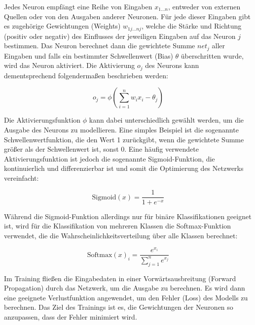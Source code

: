 Jedes Neuron empfängt eine Reihe von Eingaben $x_{1 \dots n}$, entweder von externen Quellen oder von den Ausgaben anderer Neuronen. Für jede dieser Eingaben gibt es zugehörige Gewichtungen (Weights) $w_{1j \dots nj}$, welche die Stärke und Richtung (positiv oder negativ) des Einflusses der jeweiligen Eingaben auf das Neuron $j$ bestimmen. Das Neuron berechnet dann die gewichtete Summe $net_j$ aller Eingaben und falls ein bestimmter Schwellenwert (Bias) $\theta$ überschritten wurde, wird das Neuron aktiviert. Die Aktivierung $o_j$ des Neurons kann dementsprechend folgendermaßen beschrieben werden:

\begin{equation}
	o_j = \phi \left( \sum_{i=1}^{n} w_i x_i - \theta_j \right)
	\label{eq:mp-neuron}
\end{equation}

Die Aktivierungsfunktion $\phi$ kann dabei unterschiedlich gewählt werden, um die Ausgabe des Neurons zu modellieren. Eine simples Beispiel ist die sogenannte Schwellenwertfunktion, die den Wert 1 zurückgibt, wenn die gewichtete Summe größer als der Schwellenwert ist, sonst 0. Eine häufig verwendete Aktivierungsfunktion ist jedoch die sogenannte Sigmoid-Funktion, die kontinuierlich und differenzierbar ist und somit die Optimierung des Netzwerks vereinfacht:

\begin{equation}
	\text{Sigmoid}(x) = \frac{1}{1 + e^{-x}}
	\label{eq:sigmoid}
\end{equation}

Während die Sigmoid-Funktion allerdings nur für binäre Klassifikationen geeignet ist, wird für die Klassifikation von mehreren Klassen die Softmax-Funktion verwendet, die die Wahrscheinlichkeitsverteilung über alle Klassen berechnet:

\begin{equation}
	\text{Softmax}(x)_i = \frac{e^{x_i}}{\sum_{j=1}^{n} e^{x_j}}
	\label{eq:softmax}
\end{equation}

Im Training fließen die Eingabedaten in einer Vorwärtsausbreitung (Forward Propagation) durch das Netzwerk, um die Ausgabe zu berechnen. Es wird dann eine geeignete Verlustfunktion angewendet, um den Fehler (Loss) des Modells zu berechnen. Das Ziel des Trainings ist es, die Gewichtungen der Neuronen so anzupassen, dass der Fehler minimiert wird.

